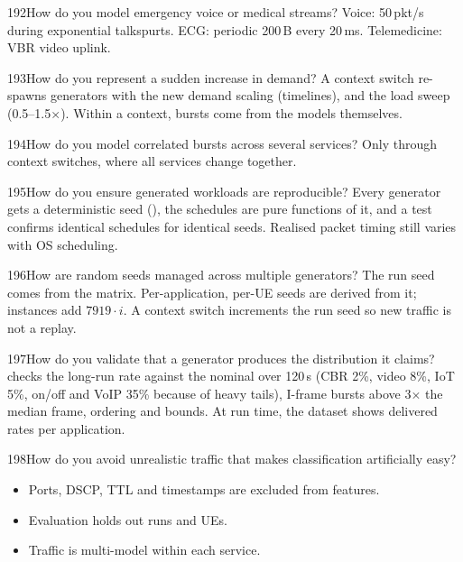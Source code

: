 \begin{qa}{192}{How do you model emergency voice or medical streams?}
Voice: 50\,pkt/s during exponential talkspurts. ECG: periodic 200\,B every 20\,ms. Telemedicine: VBR video uplink.
\end{qa}

\begin{qa}{193}{How do you represent a sudden increase in demand?}
A context switch re-spawns generators with the new demand scaling (timelines), and the load sweep (0.5--1.5$\times$).
Within a context, bursts come from the models themselves.
\end{qa}

\begin{qa}{194}{How do you model correlated bursts across several services?}
Only through context switches, where all services change together.
\end{qa}

\begin{qa}{195}{How do you ensure generated workloads are reproducible?}
Every generator gets a deterministic seed (), the schedules are pure functions of
it, and a test confirms identical schedules for identical seeds. Realised packet timing still varies with OS
scheduling.
\end{qa}

\begin{qa}{196}{How are random seeds managed across multiple generators?}
The run seed comes from the matrix. Per-application, per-UE seeds are derived from it; instances add $7919\cdot i$.
A context switch increments the run seed so new traffic is not a replay.
\end{qa}

\begin{qa}{197}{How do you validate that a generator produces the distribution it claims?}
 checks the long-run rate against the nominal over 120\,s (CBR 2\%, video 8\%,
IoT 5\%, on/off and VoIP 35\% because of heavy tails), I-frame bursts above 3$\times$ the median frame, ordering and
bounds. At run time, the dataset shows delivered rates per application.
\end{qa}

\begin{qa}{198}{How do you avoid unrealistic traffic that makes classification artificially easy?}
\begin{itemize}
\item Ports, DSCP, TTL and timestamps are excluded from features.
\item Evaluation holds out runs and UEs.
\item Traffic is multi-model within each service.
\end{itemize}
\end{qa}

